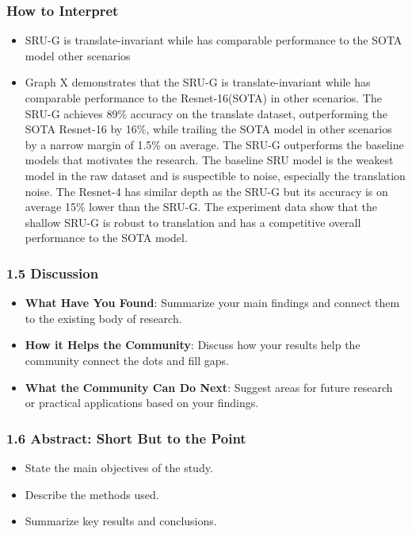 \documentclass{beamer}
\begin{document}
    
    \begin{frame}
    \frametitle{How to Interpret}
    \begin{itemize}
        \item SRU-G is translate-invariant while has comparable performance to the SOTA model other scenarios
        \item Graph X demonstrates that the SRU-G is translate-invariant while has comparable performance to the Resnet-16(SOTA) in other scenarios.
        The SRU-G achieves 89\% accuracy on the translate dataset, outperforming the SOTA Resnet-16 by 16\%, while trailing the SOTA model in other scenarios by a narrow margin of 1.5\% on average.
        The SRU-G outperforms the baseline models that motivates the research. The baseline SRU model is the weakest model in the raw dataset and is suspectible to noise, especially the translation noise. The Resnet-4 has similar depth as the SRU-G but its accuracy is on average 15\% lower than the SRU-G.
        The experiment data show that the shallow SRU-G is robust to translation and has a competitive overall performance to the SOTA model.
    \end{itemize}
    \end{frame}
    
    
    \begin{frame}
    \frametitle{1.5 Discussion}
    \begin{itemize}
        \item \textbf{What Have You Found}: Summarize your main findings and connect them to the existing body of research.
        \item \textbf{How it Helps the Community}: Discuss how your results help the community connect the dots and fill gaps.
        \item \textbf{What the Community Can Do Next}: Suggest areas for future research or practical applications based on your findings.
    \end{itemize}
    \end{frame}
    
    \begin{frame}
    \frametitle{1.6 Abstract: Short But to the Point}
    \begin{itemize}
        \item State the main objectives of the study.
        \item Describe the methods used.
        \item Summarize key results and conclusions.
    \end{itemize}
    \end{frame}
    
\end{document}
